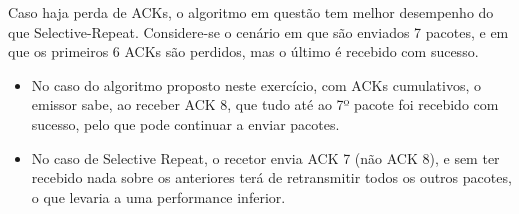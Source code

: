 \begin{enumerate}[leftmargin=\labelsep]

        Caso haja perda de ACKs, o algoritmo em questão tem melhor desempenho do que
        Selective-Repeat. Considere-se o cenário em que são enviados 7 pacotes, e em que
        os primeiros 6 ACKs são perdidos, mas o último é recebido com sucesso.

        \begin{itemize}
          \item No caso do algoritmo proposto neste exercício, com ACKs cumulativos,
                o emissor sabe, ao receber ACK 8, que tudo até ao 7º pacote foi recebido
                com sucesso, pelo que pode continuar a enviar pacotes.
          \item No caso de Selective Repeat, o recetor envia ACK 7 (não ACK 8),
                e sem ter recebido nada sobre os anteriores terá de retransmitir todos os
                outros pacotes, o que levaria a uma performance inferior.
        \end{itemize}

\end{enumerate}